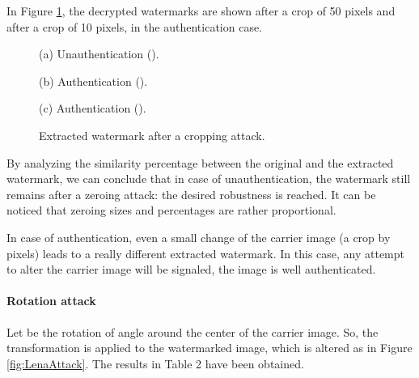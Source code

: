\documentclass[journal]{IEEEtran}
\begin{document}
In Figure \ref{fig:Dechiffrement_invader}, the decrypted watermarks are shown after a crop of 50 pixels and after a crop of 10 pixels, in the authentication case.

\begin{figure}[htb]
\begin{minipage}[b]{1.0\linewidth}
  \centering
 \centerline{}
  \centerline{(a) Unauthentication ().}
\end{minipage}
\begin{minipage}[b]{.48\linewidth}
  \centering
 \centerline{}
  \centerline{(b) Authentication  ().}
\end{minipage}
\hfill
\begin{minipage}[b]{0.48\linewidth}
  \centering
 \centerline{}
  \centerline{(c) Authentication  ().}
\end{minipage}
\caption{Extracted watermark after a cropping attack.}
\label{fig:Dechiffrement_invader}
\end{figure}


By analyzing the similarity percentage between the original and the
extracted watermark, we can conclude that in case of unauthentication, the
watermark still remains after a zeroing attack: the desired robustness is
reached. It can be noticed that zeroing sizes and percentages are rather
proportional.

In case of authentication, even a small change of the carrier image (a crop
by  pixels) leads to a really different extracted watermark.
In this case, any attempt to alter the carrier image will be signaled, the
image is well authenticated.

\paragraph{Rotation attack}

Let  be the rotation of angle  around the center  of the carrier image. So, the transformation  is applied to the watermarked image, which is altered as in Figure \ref{fig:LenaAttack}. The results in Table 2 have been obtained.
\end{document}
